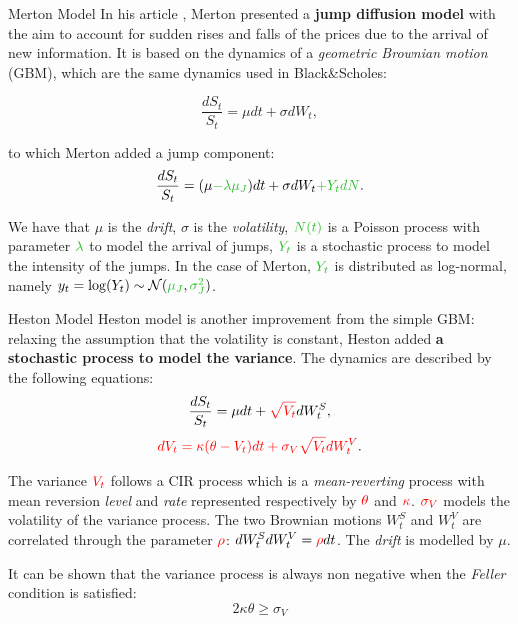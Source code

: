 \documentclass[c, 10pt]{beamer}
\begin{document}
\begin{frame}{Merton Model}
In his article \citep{MERTON1976}, Merton presented a \textbf{jump diffusion model} with the aim to account for sudden rises and falls of the prices due to the arrival of new information. It is based on the dynamics of a \textit{geometric Brownian motion} (GBM), which are the same dynamics used in Black\&Scholes:

\begin{equation*}
\frac{dS_t}{S_t} = \mu dt + \sigma dW_t ,
\end{equation*}

\noindent
to which Merton added a jump component:
\begin{equation*}
\frac{dS_t}{S_t} = (\mu \textcolor{mygreen}{- \lambda \mu_J}) dt + \sigma dW_t  \textcolor{mygreen}{+ Y_t dN}.
\end{equation*}

We have that $\mu$ is the \textit{drift}, $\sigma$ is the \textit{volatility}, $\textcolor{mygreen}{N(t)}$ is a Poisson process with parameter $\textcolor{mygreen}{\lambda}$ to model the arrival of jumps, $\textcolor{mygreen}{Y_t}$ is a stochastic process to model the intensity of the jumps. In the case of Merton, $\textcolor{mygreen}{Y_t}$ is distributed as log-normal, namely $y_t = \log(Y_t) \sim \mathcal{N}(\textcolor{mygreen}{\mu_J}, \textcolor{mygreen}{\sigma_J^2})$.
\end{frame}



\begin{frame}{Heston Model}
Heston model  \citep{HESTON93} is another improvement from the simple GBM: relaxing the assumption that the volatility is constant, Heston added \textbf{a stochastic process to model the variance}. The dynamics are described by the following equations:
\begin{equation*}
\frac{dS_t}{S_t} = \mu dt +\textcolor{red}{\sqrt{ V_t} }dW_t^S,
\end{equation*}
\begin{equation*}
\textcolor{red}{dV_t = \kappa (\theta - V_t) dt + \sigma_V \sqrt{V_t} dW_t^V}.
\end{equation*}

The variance $\textcolor{red}{V_t}$ follows a CIR process \citep{CIR85} which is a \textit{mean-reverting} process with mean reversion \textit{level} and \textit{rate} represented respectively by $\textcolor{red}{\theta}$ and $\textcolor{red}{\kappa}$. 
$\textcolor{red}{\sigma_V}$ models the volatility of the variance process. The two Brownian motions $W_t^S$ and $W_t^V$ are correlated through the parameter $\textcolor{red}{\rho}$: $dW_t^S dW_t^V = \textcolor{red}{\rho} dt$. The \textit{drift} is modelled by $\mu$.

\bigskip
It can be shown that the variance process is always non negative when the \textit{Feller} condition is satisfied:
\begin{equation*}
2\kappa\theta \geq \sigma_V
\end{equation*}
\end{frame}
\end{document}
